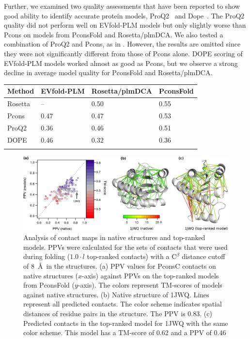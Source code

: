 \documentclass{bioinfo}
\begin{document}
Further, we examined two quality assessments that have been reported
to show good ability to identify accurate protein models, ProQ2~\cite[]{ray_improved_2012} and Dope~\cite[]{Shen17075131}.
The ProQ2 quality did not perform well on EVfold-PLM models but only slightly worse than
Pcons on models from PconsFold and Rosetta/plmDCA. We also tested a
combination of ProQ2 and Pcons, as in \cite{wallner_pcons.net:_2007}. However, the results are omitted
since they were not significantly different from those of Pcons
alone. DOPE scoring of EVfold-PLM models worked almost as good as Pcons,
but we observe a strong decline in average model quality for PconsFold
and Rosetta/plmDCA. 

\begin{table}[!t]
{\begin{tabular}{llll}\toprule
        Method & EVfold-PLM & Rosetta/plmDCA & PconsFold \\ \midrule
        Rosetta & -- & 0.50 & 0.55 \\
        Pcons & 0.47 & 0.47 & 0.53 \\
        ProQ2 & 0.36 & 0.46 & 0.51 \\
        DOPE & 0.46 & 0.32 & 0.36 \\ \botrule
\end{tabular}}{}
\end{table}

\begin{figure}[!tpb]%
\centerline{\includegraphics[scale=0.6]{figures/qa.eps}}
\caption{Analysis of contact maps in native structures and
top-ranked models. PPVs were calculated for the sets of contacts that
were used during folding ($1.0 \cdot l$ top-ranked contacts) with a
C$^\beta$ distance cutoff of 8~\AA\ in the structures. (a) PPV values for PconsC contacts on native structures 
($x$-axis) against PPVs on the top-ranked models from PconsFold 
($y$-axis). The colors represent TM-scores of models against native
structures. (b) Native structure of 1JWQ. Lines represent all predicted contacts. The color 
scheme indicates spatial distances of residue pairs in the 
structure. The PPV is 0.83. (c) Predicted contacts in the top-ranked 
model for 1JWQ with the same color scheme. This model has a TM-score 
of 0.62 and a PPV of 0.46}\label{fig:qa}
\end{figure}
\end{document}
